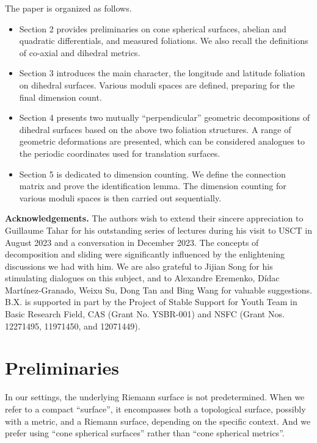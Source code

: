 \documentclass[pdflatex,sn-mathphys]{sn-jnl}%
\numberwithin{equation}{section}
\theoremstyle{thmstyleone}%
\newcommand{\csphsf}{cone spherical surface}
\newcommand{\csphmtr}{cone spherical metric}
\begin{document}
\begin{figure}[omitted: a diagram of this paper's results, not reproduced here]\label{fig:flow_chart}\end{figure}
The paper is organized as follows.
\begin{itemize}
    \item Section 2 provides preliminaries on \csphsf s, abelian and quadratic differentials, and measured foliations. We also recall the definitions of co-axial and dihedral metrics.
    \item Section 3 introduces the main character, the longitude and latitude foliation on dihedral surfaces. Various moduli spaces are defined, preparing for the final dimension count. %
    \item Section 4 presents two mutually “perpendicular” geometric decompositions of dihedral surfaces based on the above two foliation structures. 
    A range of geometric deformations are presented, which can be considered analogues to the periodic coordinates used for translation surfaces.
    \item Section 5 is dedicated to dimension counting. We define the connection matrix and prove the identification lemma. The dimension counting for various moduli spaces is then carried out sequentially. %
\end{itemize}

\noindent \textbf{Acknowledgements.} The authors wish to extend their sincere appreciation to Guillaume Tahar for his outstanding series of lectures during his visit to USCT in August 2023 and a conversation in December 2023. The concepts of decomposition and sliding were significantly influenced by the enlightening discussions we had with him. We are also grateful to Jijian Song for his stimulating dialogues on this subject, and to Alexandre Eremenko, Dídac Martínez-Granado, Weixu Su, Dong Tan and Bing Wang for valuable suggestions. 
B.X. is supported in part by the Project of Stable Support for Youth Team in Basic Research Field, CAS (Grant No. YSBR-001) and NSFC (Grant Nos. 12271495, 11971450, and 12071449).

\section{Preliminaries} \label{sec:csphsf}
In our settings, the underlying Riemann surface is not predetermined. When we refer to a compact ``surface'', it encompasses both a topological surface, possibly with a metric, and a Riemann surface, depending on the specific context. And we prefer using ``\csphsf s'' rather than ``\csphmtr s''.
\end{document}
